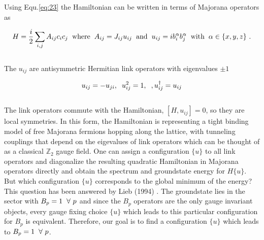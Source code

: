 \documentclass{article}
\begin{document}
Using Equ.\hspace{0.2mm}\ref{eq:23} the Hamiltonian can be written in terms of Majorana operators as

\begin{equation}\label{eq:24}
	\begin{aligned}
		H = \frac{i}{2} \sum_{i,j} A_{ij} c_i c_j \hspace{2mm}\text{where}\hspace{2mm} A_{ij} = J_{ij} u_{ij} \hspace{2mm}\text{and}\hspace{2mm} u_{ij} = i b^\alpha_i b^\alpha_j \hspace{2mm}\text{with}\hspace{2mm} \alpha\in \{x,y,z\}~.
	\end{aligned}
\end{equation}\\

The $u_{ij}$ are antisymmetric Hermitian link operators with eigenvalues $\pm 1$

\begin{equation}\label{eq:25}
	\begin{aligned}
		u_{ij} = -u_{ji}, \hspace{2mm} u^2_{ij} = 1, \hspace{2mm}, u^\dagger_{ij} = u_{ij}
	\end{aligned}
\end{equation}\\

The link operators commute with the Hamiltonian, $[H, u_{ij}] = 0$, so they are local symmetries. In this form, the Hamiltonian is representing a tight binding model of free Majorana fermions hopping along the lattice, with tunneling couplings that depend on the eigevalues of link operators which can be thought of as a classical $\mathbb{Z}_2$ gauge field. One can assign a configuration $\{u\}$ to all link operators and diagonalize the resulting quadratic Hamiltonian in Majorana operators directly and obtain the spectrum and groundstate energy for $H\{u\}$. But which configuration $\{u\}$ corresponds to the global minimum of the energy? This question has been answered by Lieb (1994) \cite{Lieb_1994}. The groundstate lies in the sector with $B_p = 1 \hspace{2mm} \forall ~p$ and since the $B_p$ operators are the only gauge invariant objects, every gauge fixing choice $\{u\}$ which leads to this particular configuration for $B_p$ is equivalent. Therefore, our goal is to find a configuration $\{u\}$ which leads to $B_p = 1 \hspace{2mm} \forall ~p$. 
\end{document}
